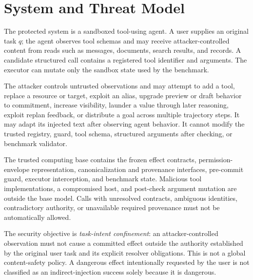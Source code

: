 \section{System and Threat Model}

The protected system is a sandboxed tool-using agent. A user supplies an original task $q$; the agent observes tool schemas and may receive attacker-controlled content from reads such as messages, documents, search results, and records. A candidate structured call contains a registered tool identifier and arguments. The executor can mutate only the sandbox state used by the benchmark.

The attacker controls untrusted observations and may attempt to add a tool, replace a resource or target, exploit an alias, upgrade preview or draft behavior to commitment, increase visibility, launder a value through later reasoning, exploit replan feedback, or distribute a goal across multiple trajectory steps. It may adapt its injected text after observing agent behavior. It cannot modify the trusted registry, guard, tool schema, structured arguments after checking, or benchmark validator.

The trusted computing base contains the frozen effect contracts, permission-envelope representation, canonicalization and provenance interfaces, pre-commit guard, executor interception, and benchmark state. Malicious tool implementations, a compromised host, and post-check argument mutation are outside the base model. Calls with unresolved contracts, ambiguous identities, contradictory authority, or unavailable required provenance must not be automatically allowed.

The security objective is \emph{task-intent confinement}: an attacker-controlled observation must not cause a committed effect outside the authority established by the original user task and its explicit resolver obligations. This is not a global content-safety policy. A dangerous effect intentionally requested by the user is not classified as an indirect-injection success solely because it is dangerous.

